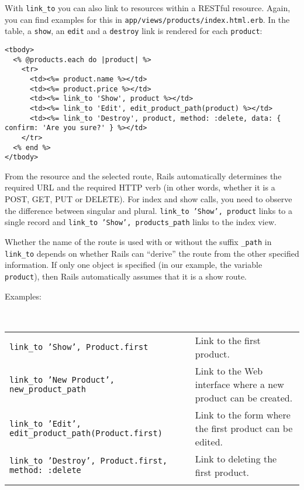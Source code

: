 \documentclass[a4paper]{book}
\newcounter{tab}[chapter]
\begin{document}
With \texttt{link\_to} you can also link to resources within a RESTful resource. Again, you can find examples for this in \texttt{app/views/products/index.html.erb}. In the table, a \texttt{show}, an \texttt{edit} and a \texttt{destroy} link is rendered for each \texttt{product}:

\begin{shaded}\begin{verbatim}
<tbody>
  <% @products.each do |product| %>
    <tr>
      <td><%= product.name %></td>
      <td><%= product.price %></td>
      <td><%= link_to 'Show', product %></td>
      <td><%= link_to 'Edit', edit_product_path(product) %></td>
      <td><%= link_to 'Destroy', product, method: :delete, data: { confirm: 'Are you sure?' } %></td>
    </tr>
  <% end %>
</tbody>
\end{verbatim}\end{shaded}

From the resource and the selected route, Rails automatically determines the required URL and the required HTTP verb (in other words, whether it is a POST, GET, PUT or DELETE). For index and show calls, you need to observe the difference between singular and plural. \texttt{link\_to 'Show', product} links to a single record and \texttt{link\_to 'Show', products\_path} links to the index view.

Whether the name of the route is used with or without the suffix \texttt{\_path} in \texttt{link\_to} depends on whether Rails can “derive” the route from the other specified information. If only one object is specified (in our example, the variable \texttt{product}), then Rails automatically assumes that it is a show route.

Examples:

\begin{longtable}[c]{@{}lp{10cm}@{}}
\caption{~}\\
\toprule\addlinespace
\texttt{link\_to 'Show', Product.first} & Link to the first product.
\\\addlinespace
\texttt{link\_to 'New Product',                 new\_product\_path} & Link to the Web interface where a new product can be created.
\\\addlinespace
\texttt{link\_to 'Edit',                 edit\_product\_path(Product.first)} & Link to the form where the first product can be edited.
\\\addlinespace
\texttt{link\_to 'Destroy', Product.first, method:                 :delete} & Link to deleting the first product.
\\\addlinespace
\bottomrule
\end{longtable}
\end{document}
